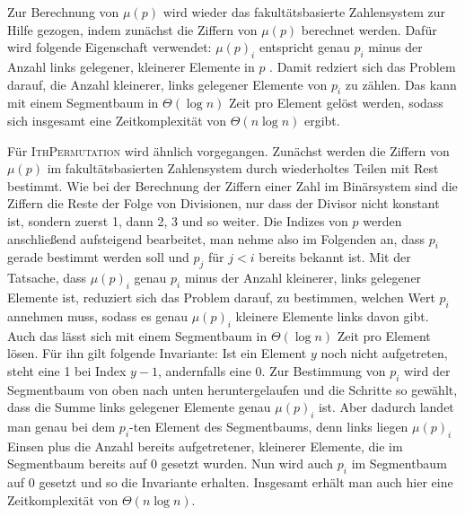 \documentclass[a4paper, 11pt, ngerman]{article}
\begin{document}
Zur Berechnung von $\mu(p)$ wird wieder das fakultätsbasierte Zahlensystem zur Hilfe gezogen, indem zunächst die Ziffern von $\mu(p)$ berechnet werden. Dafür wird folgende Eigenschaft verwendet: $\mu(p)_i$ entspricht genau $p_i$ minus der Anzahl links gelegener, kleinerer Elemente in $p$ \cite{permutationranking}. Damit redziert sich das Problem darauf, die Anzahl kleinerer, links gelegener Elemente von $p_i$ zu zählen. Das kann mit einem Segmentbaum in $\Theta(\log n)$ Zeit pro Element gelöst werden, sodass sich insgesamt eine Zeitkomplexität von $\Theta(n \log n)$ ergibt.

Für \textsc{IthPermutation} wird ähnlich vorgegangen. Zunächst werden die Ziffern von $\mu(p)$ im fakultätsbasierten Zahlensystem durch wiederholtes Teilen mit Rest bestimmt. Wie bei der Berechnung der Ziffern einer Zahl im Binärsystem sind die Ziffern die Reste der Folge von Divisionen, nur dass der Divisor nicht konstant ist, sondern zuerst 1, dann 2, 3 und so weiter. Die Indizes von $p$ werden anschließend aufsteigend bearbeitet, man nehme also im Folgenden an, dass $p_i$ gerade bestimmt werden soll und $p_j$ für $j < i$ bereits bekannt ist. Mit der Tatsache, dass $\mu(p)_i$ genau $p_i$ minus der Anzahl kleinerer, links gelegener Elemente ist, reduziert sich das Problem darauf, zu bestimmen, welchen Wert $p_i$ annehmen muss, sodass es genau $\mu(p)_i$ kleinere Elemente links davon gibt. Auch das lässt sich mit einem Segmentbaum in $\Theta(\log n)$ Zeit pro Element lösen. Für ihn gilt folgende Invariante: Ist ein Element $y$ noch nicht aufgetreten, steht eine 1 bei Index $y-1$, andernfalls eine 0. Zur Bestimmung von $p_i$ wird der Segmentbaum von oben nach unten heruntergelaufen und die Schritte so gewählt, dass die Summe links gelegener Elemente genau $\mu(p)_i$ ist. Aber dadurch landet man genau bei dem $p_i$-ten Element des Segmentbaums, denn links liegen $\mu(p)_i$ Einsen plus die Anzahl bereits aufgetretener, kleinerer Elemente, die im Segmentbaum bereits auf 0 gesetzt wurden. Nun wird auch $p_i$ im Segmentbaum auf 0 gesetzt und so die Invariante erhalten. Insgesamt erhält man auch hier eine Zeitkomplexität von $\Theta(n \log n)$.
\bigskip
\end{document}
